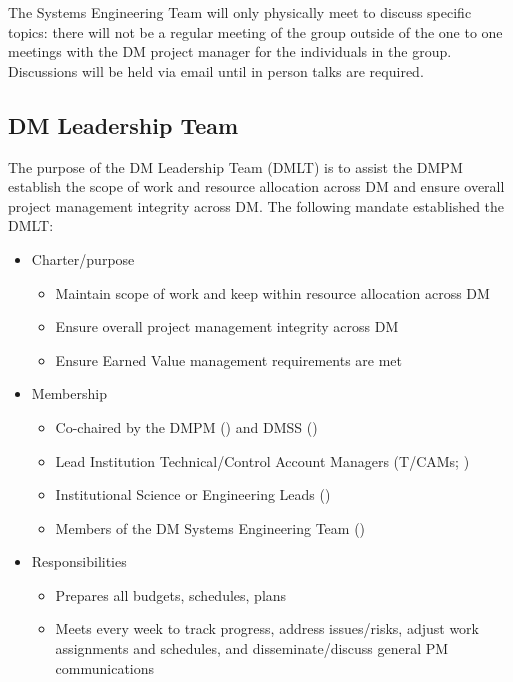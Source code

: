 The Systems Engineering Team will only physically meet to discuss specific topics: there will not be a regular meeting of the group outside of the one to one meetings with the DM project manager for the individuals in the group.
Discussions will be held via email until in person talks are required.

\subsection{DM Leadership Team \label{sect:dmlt}}

The purpose of the DM Leadership Team (DMLT) is to assist the DMPM  establish the scope of work and resource allocation across DM and ensure overall project management integrity across DM.
The following mandate established the DMLT:

\begin{itemize}
\item Charter/purpose
	\begin{itemize}
	\item Maintain scope of work and keep within resource allocation across DM
	\item Ensure overall project management integrity across DM
	\item Ensure Earned Value management requirements are met
	\end{itemize}
\item Membership
	\begin{itemize}
	\item Co-chaired by the \gls{DMPM} () and \gls{DMSS} ()
	\item Lead Institution Technical/Control Account Managers (T/CAMs; )
	\item Institutional Science or Engineering Leads ()
	\item Members of the DM Systems Engineering Team ()
	\end{itemize}
\item Responsibilities
	\begin{itemize}
	\item Prepares all budgets, schedules, plans
	\item Meets every week to track progress, address issues/risks, adjust work assignments and schedules, and disseminate/discuss general PM communications
	\end{itemize}
\end{itemize}

